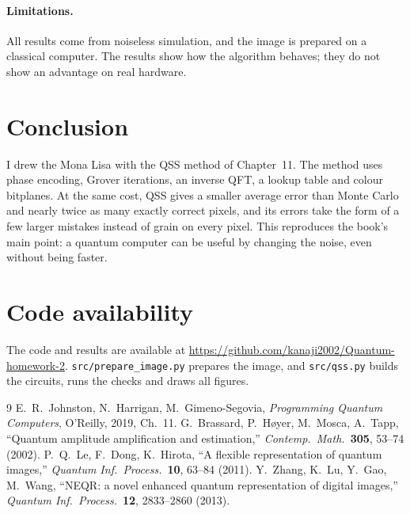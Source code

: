 \documentclass[10pt,twocolumn,a4paper]{article}
\begin{document}
\paragraph{Limitations.}
All results come from noiseless simulation, and the image is prepared on a
classical computer. The results show how the algorithm behaves; they do not
show an advantage on real hardware.

\section{Conclusion}
I drew the Mona Lisa with the QSS method of Chapter~11. The method uses phase
encoding, Grover iterations, an inverse QFT, a lookup table and colour
bitplanes. At the same cost, QSS gives a smaller average error than Monte Carlo
and nearly twice as many exactly correct pixels, and its errors take the form of
a few larger mistakes instead of grain on every pixel. This reproduces the
book's main point: a quantum computer can be useful by changing the noise, even
without being faster.

\section*{Code availability}
The code and results are available at
\url{https://github.com/kanaji2002/Quantum-homework-2}.
\texttt{src/prepare\_image.py} prepares the image, and \texttt{src/qss.py}
builds the circuits, runs the checks and draws all figures.

\begin{thebibliography}{9}\small
{} E.~R.~Johnston, N.~Harrigan, M.~Gimeno-Segovia,
\emph{Programming Quantum Computers}, O'Reilly, 2019, Ch.~11.
 G.~Brassard, P.~H{\o}yer, M.~Mosca, A.~Tapp, ``Quantum
amplitude amplification and estimation,'' \emph{Contemp.\ Math.}\
\textbf{305}, 53--74 (2002).
 P.~Q.~Le, F.~Dong, K.~Hirota, ``A flexible representation of
quantum images,'' \emph{Quantum Inf.\ Process.}\ \textbf{10}, 63--84 (2011).
\bibitem{neqr} Y.~Zhang, K.~Lu, Y.~Gao, M.~Wang, ``NEQR: a novel enhanced
quantum representation of digital images,'' \emph{Quantum Inf.\ Process.}\
\textbf{12}, 2833--2860 (2013).
\end{thebibliography}
\end{document}
